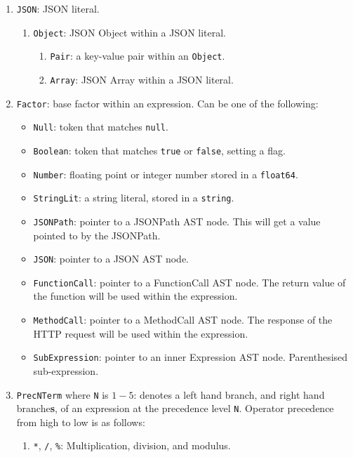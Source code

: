 \documentclass[]{full}
\theoremstyle{definition}
\begin{document}
\begin{enumerate}
    \item \verb|JSON|: JSON literal.
    \begin{enumerate}
        \item \verb|Object|: JSON Object within a JSON literal.
        \begin{enumerate}
            \item \verb|Pair|: a key-value pair within an \verb|Object|.
        \item \verb|Array|: JSON Array within a JSON literal.
        \end{enumerate}
    \end{enumerate}
    \item \verb|Factor|: base factor within an expression. Can be one of the following:
    \begin{itemize}
        \item \verb|Null|: token that matches \verb|null|.
        \item \verb|Boolean|: token that matches \verb|true| or \verb|false|, setting a flag.
        \item \verb|Number|: floating point or integer number stored in a \verb|float64|.
        \item \verb|StringLit|: a string literal, stored in a \verb|string|.
        \item \verb|JSONPath|: pointer to a JSONPath AST node. This will get a value pointed to by the JSONPath.
        \item \verb|JSON|: pointer to a JSON AST node.
        \item \verb|FunctionCall|: pointer to a FunctionCall AST node. The return value of the function will be used within the expression.
        \item \verb|MethodCall|: pointer to a MethodCall AST node. The response of the HTTP request will be used within the expression.
        \item \verb|SubExpression|: pointer to an inner Expression AST node. Parenthesised sub-expression.
    \end{itemize}
    \item \verb|PrecNTerm| where \verb|N| is $1-5$: denotes a left hand branch, and right hand branche\textbf{s}, of an expression at the precedence level \verb|N|. Operator precedence from high to low is as follows:
    \begin{enumerate}
        \item \verb|*|, \verb|/|, \verb|%|: Multiplication, division, and modulus.

\end{enumerate}
\end{enumerate}
\end{document}
